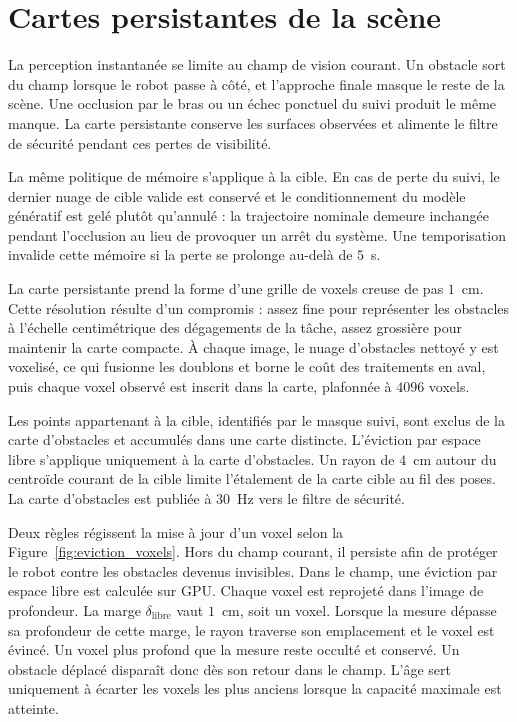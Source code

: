 \section{Cartes persistantes de la scène} \label{sec:persistant_map}
La perception instantanée se limite au champ de vision courant. Un obstacle sort du champ lorsque le robot passe à côté, et l'approche finale masque le reste de la scène. Une occlusion par le bras ou un échec ponctuel du suivi produit le même manque. La carte persistante conserve les surfaces observées et alimente le filtre de sécurité pendant ces pertes de visibilité.

La même politique de mémoire s'applique à la cible. En cas de perte du suivi, le dernier nuage de cible valide est conservé et le conditionnement du modèle génératif est gelé plutôt qu'annulé : la trajectoire nominale demeure inchangée pendant l'occlusion au lieu de provoquer un arrêt du système. Une temporisation invalide cette mémoire si la perte se prolonge au-delà de $5$~s.

La carte persistante prend la forme d'une grille de voxels creuse de pas $1$~cm. Cette résolution résulte d'un compromis : assez fine pour représenter les obstacles à l'échelle centimétrique des dégagements de la tâche, assez grossière pour maintenir la carte compacte. À chaque image, le nuage d'obstacles nettoyé y est voxelisé, ce qui fusionne les doublons et borne le coût des traitements en aval, puis chaque voxel observé est inscrit dans la carte, plafonnée à $4096$ voxels.

Les points appartenant à la cible, identifiés par le masque suivi, sont exclus de la carte d'obstacles et accumulés dans une carte distincte. L'éviction par espace libre s'applique uniquement à la carte d'obstacles. Un rayon de $4$~cm autour du centroïde courant de la cible limite l'étalement de la carte cible au fil des poses. La carte d'obstacles est publiée à $30$~Hz vers le filtre de sécurité.

Deux règles régissent la mise à jour d'un voxel selon la Figure~\ref{fig:eviction_voxels}. Hors du champ courant, il persiste afin de protéger le robot contre les obstacles devenus invisibles. Dans le champ, une éviction par espace libre est calculée sur \ac{GPU}. Chaque voxel est reprojeté dans l'image de profondeur. La marge $\delta_{\mathrm{libre}}$ vaut $1$~cm, soit un voxel. Lorsque la mesure dépasse sa profondeur de cette marge, le rayon traverse son emplacement et le voxel est évincé. Un voxel plus profond que la mesure reste occulté et conservé. Un obstacle déplacé disparaît donc dès son retour dans le champ. L'âge sert uniquement à écarter les voxels les plus anciens lorsque la capacité maximale est atteinte.

